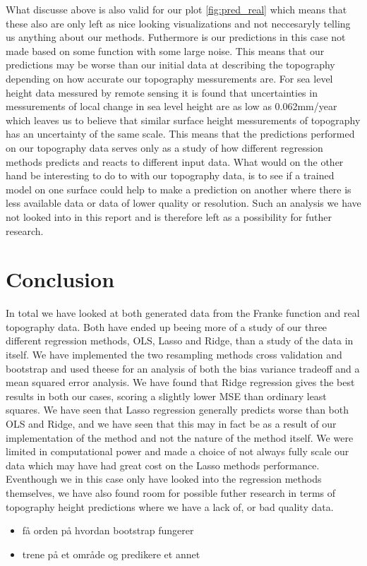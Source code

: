 \documentclass[12pt]{article}
\begin{document}
What discusse above is also valid for our plot \ref{fig:pred_real} which means that these also are only left as nice looking visualizations and not neccesaryly telling us anything about our methods. Futhermore is our predictions in this case not made based on some function with some large noise. This means that our predictions may be worse than our initial data at describing the topography depending on how accurate our topography messurements are. For sea level height data messured by remote sensing it is found that uncertainties in messurements of local change in sea level height are as low as 0.062mm/year \cite{sealevel} which leaves us to believe that similar surface height messurements of topography has an uncertainty of the same scale. This means that the predictions performed on our topography data serves only as a study of how different regression methods predicts and reacts to different input data. What would on the other hand be interesting to do to with our topography data, is to see if a trained model on one surface could help to make a prediction on another where there is less available data or data of lower quality or resolution. Such an analysis we have not looked into in this report and is therefore left as a possibility for futher research.

\section{Conclusion}
In total we have looked at both generated data from the Franke function and real topography data. Both have ended up beeing more of a study of our three different regression methods, OLS, Lasso and Ridge, than a study of the data in itself. We have implemented the two resampling methods cross validation and bootstrap and used theese for an analysis of both the bias variance tradeoff and a mean squared error analysis. We have found that Ridge regression gives the best results in both our cases, scoring a slightly lower MSE than ordinary least squares. We have seen that Lasso regression generally predicts worse than both OLS and Ridge, and we have seen that this may in fact be as a result of our implementation of the method and not the nature of the method itself. We were limited in computational power and made a choice of not always fully scale our data which may have had great cost on the Lasso methods performance. Eventhough we in this case only have looked into the regression methods themselves, we have also found room for possible futher research in terms of topography height predictions where we have a lack of, or bad quality data.

\begin{itemize}
  \item få orden på hvordan bootstrap fungerer
  \item trene på et område og predikere et annet
\end{itemize}
\printbibliography
\end{document}
